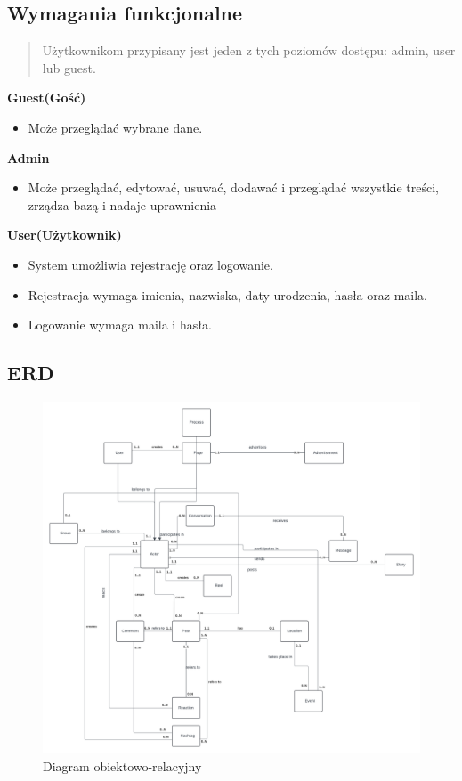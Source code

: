 \documentclass{article}
\begin{document}
\subsection{Wymagania funkcjonalne}

\begin{abstract}
    Użytkownikom przypisany jest jeden z tych poziomów dostępu: admin, user lub guest.
\end{abstract}

\textbf{Guest(Gość)}

\begin{itemize}
    \item Może przeglądać wybrane dane.
\end{itemize}

\textbf{Admin}

\begin{itemize}
    \item Może przeglądać, edytować, usuwać, dodawać i przeglądać wszystkie treści, zrządza bazą i nadaje uprawnienia
\end{itemize}

\textbf{User(Użytkownik)}

\begin{itemize}
    \item System umożliwia rejestrację oraz logowanie.
    \item Rejestracja wymaga imienia, nazwiska, daty urodzenia, hasła oraz maila.
    \item Logowanie wymaga maila i hasła.
\end{itemize}


\subsection{ERD}

\begin{figure}[H]
    \centering
    \includegraphics[width=\linewidth]{images/Blank diagram.png}
    \caption{Diagram obiektowo-relacyjny}
    \label{fig:erd}
\end{figure}
\end{document}
